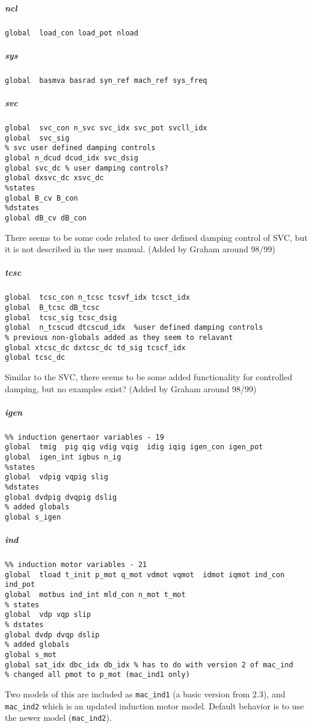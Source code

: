\documentclass[12pt]{article}
\begin{document}
\subparagraph{ncl}
\begin{verbatim}
global  load_con load_pot nload
\end{verbatim}
\subparagraph{sys}
\begin{verbatim}
global  basmva basrad syn_ref mach_ref sys_freq
\end{verbatim}

\subparagraph{svc}
\begin{verbatim}
global  svc_con n_svc svc_idx svc_pot svcll_idx
global  svc_sig
% svc user defined damping controls
global n_dcud dcud_idx svc_dsig
global svc_dc % user damping controls?
global dxsvc_dc xsvc_dc
%states
global B_cv B_con
%dstates
global dB_cv dB_con
\end{verbatim}
There seems to be some code related to user defined damping control of SVC, but it is not described in the user manual. 
(Added by Graham around 98/99)


\subparagraph{tcsc}
\begin{verbatim}
global  tcsc_con n_tcsc tcsvf_idx tcsct_idx
global  B_tcsc dB_tcsc
global  tcsc_sig tcsc_dsig
global  n_tcscud dtcscud_idx  %user defined damping controls
% previous non-globals added as they seem to relavant
global xtcsc_dc dxtcsc_dc td_sig tcscf_idx 
global tcsc_dc
\end{verbatim}
Similar to the SVC, there seems to be some added functionality for controlled damping, but no examples exist? (Added by Graham around 98/99)

\subparagraph{igen}
\begin{verbatim}
%% induction genertaor variables - 19
global  tmig  pig qig vdig vqig  idig iqig igen_con igen_pot
global  igen_int igbus n_ig
%states
global  vdpig vqpig slig
%dstates
global dvdpig dvqpig dslig
% added globals
global s_igen
\end{verbatim}


\subparagraph{ind}
\begin{verbatim}
%% induction motor variables - 21
global  tload t_init p_mot q_mot vdmot vqmot  idmot iqmot ind_con ind_pot
global  motbus ind_int mld_con n_mot t_mot
% states
global  vdp vqp slip
% dstates
global dvdp dvqp dslip
% added globals
global s_mot
global sat_idx dbc_idx db_idx % has to do with version 2 of mac_ind
% changed all pmot to p_mot (mac_ind1 only)
\end{verbatim}
Two models of this are included as \verb|mac_ind1| (a basic version from 2.3), and \verb|mac_ind2| which is an updated induction motor model. Default behavior is to use the newer model (\verb|mac_ind2|).
\end{document}

